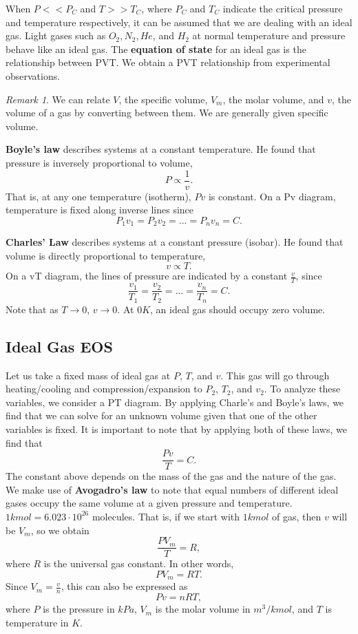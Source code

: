 \documentclass[11pt]{article}
\theoremstyle{plain} %
\theoremstyle{definition}
\theoremstyle{example}
\theoremstyle{remark}
\newtheorem*{remark}{Remark}
\begin{document}
When $P<<P_C$ and $T>>T_C$, where $P_C$ and $T_C$ indicate the critical pressure and temperature respectively, it can be assumed that we are dealing with an ideal gas. Light gases such as $O_2, N_2, He$, and $H_2$ at normal temperature and pressure behave like an ideal gas. The \textbf{equation of state} for an ideal gas is the relationship between PVT. We obtain a PVT relationship from experimental observations.
\begin{remark}
We can relate $V$, the specific volume, $V_m$, the molar volume, and $v$, the volume of a gas by converting between them. We are generally given specific volume. 
\end{remark}
 \textbf{Boyle's law} describes systems at a constant temperature. He found that pressure is inversely proportional to volume, 
$$P \propto \frac{1}{v}.$$
That is, at any one temperature (isotherm), $Pv$ is constant. On a Pv diagram, temperature is fixed along inverse lines since $$P_1v_1 = P_2v_2 = ...=P_nv_n =C.$$

\textbf{Charles' Law} describes systems at a constant pressure (isobar). He found that volume is directly proportional to temperature,
$$v \propto T.$$
On a vT diagram, the lines of pressure are indicated by a constant $\frac{v}{T}$, since $$\frac{v_1}{T_1} = \frac{v_2}{T_2} = ...=\frac{v_n}{T_n} = C.$$
Note that as $T \rightarrow 0$, $v \rightarrow 0$. At $0K$, an ideal gas should occupy zero volume. 

\subsection{Ideal Gas EOS}

Let us take a fixed mass of ideal gas at $P$, $T$, and $v$. This gas will go through heating/cooling and compression/expansion to $P_2$, $T_2$, and $v_2$. To analyze these variables, we consider a PT diagram. By applying Charle's and Boyle's laws, we find that we can solve for an unknown volume given that one of the other variables is fixed. It is important to note that by applying both of these laws, we find that 
$$\frac{Pv}{T} = C.$$
The constant above depends on the mass of the gas and the nature of the gas. We make use of \textbf{Avogadro's law} to note that equal numbers of different ideal gases occupy the same volume at a given pressure and temperature. $1kmol = 6.023\cdot 10^{26}$ molecules. That is, if we start with $1kmol$ of gas, then $v$ will be $V_m$, so we obtain 
$$\frac{PV_m}{T} = R,$$
where $R$ is the universal gas constant. In other words, 
$$PV_m  = RT.$$
Since $V_m = \frac{v}{n}$, this can also be expressed as 
$$Pv = nRT,$$
where $P$ is the pressure in $kPa$, $V_m$ is the molar volume in $m^3/kmol$, and $T$ is temperature in $K$. 
\end{document}
